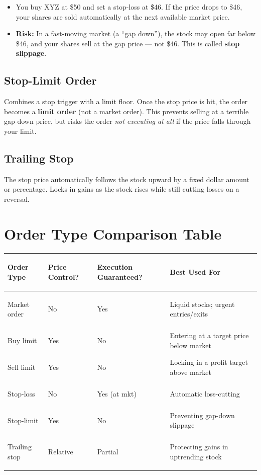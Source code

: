 \documentclass[11pt, letterpaper]{article}
\begin{document}
\begin{itemize}[noitemsep]
  \item You buy XYZ at \$50 and set a stop-loss at \$46. If the price drops to \$46, your shares are sold automatically at the next available market price.
  \item \textbf{Risk:} In a fast-moving market (a ``gap down''), the stock may open far below \$46, and your shares sell at the gap price --- not \$46. This is called \textbf{stop slippage}.
\end{itemize}

\subsection*{Stop-Limit Order}
Combines a stop trigger with a limit floor. Once the stop price is hit, the order becomes a \textbf{limit order} (not a market order). This prevents selling at a terrible gap-down price, but risks the order \emph{not executing at all} if the price falls through your limit.

\subsection*{Trailing Stop}
The stop price automatically follows the stock upward by a fixed dollar amount or percentage. Locks in gains as the stock rises while still cutting losses on a reversal.

\section*{Order Type Comparison Table}

\noindent
{\renewcommand{\arraystretch}{1.6}
\begin{tabularx}{\textwidth}{>{\bfseries\raggedright\arraybackslash}p{3.2cm}
                              >{\centering\arraybackslash}p{2cm}
                              >{\centering\arraybackslash}p{2cm}
                              >{\raggedright\arraybackslash}X}
\toprule
\rowcolor{tableheaderorange}
\textbf{Order Type} & \textbf{Price Control?} & \textbf{Execution Guaranteed?} & \textbf{Best Used For} \\
\midrule
\rowcolor{rowOr} Market order       & No  & Yes & Liquid stocks; urgent entries/exits \\
\rowcolor{rowA}  Buy limit          & Yes & No  & Entering at a target price below market \\
\rowcolor{rowOr} Sell limit         & Yes & No  & Locking in a profit target above market \\
\rowcolor{rowA}  Stop-loss          & No  & Yes (at mkt) & Automatic loss-cutting \\
\rowcolor{rowOr} Stop-limit         & Yes & No  & Preventing gap-down slippage \\
\rowcolor{rowA}  Trailing stop      & Relative & Partial & Protecting gains in uptrending stock \\
\bottomrule
\end{tabularx}}
\end{document}
